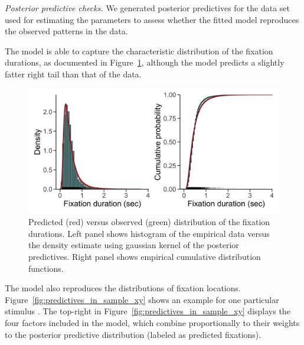 \documentclass{article}
\begin{document}
\textit{Posterior predictive checks.} We generated posterior predictives for the data set used for estimating the parameters to assess whether the fitted model reproduces the observed patterns in the data.

The model is able to capture the characteristic distribution of the fixation durations, as documented in Figure~\ref{fig:predictives_in_sample_durations}, although the model predicts a slightly fatter right tail than that of the data.

\begin{figure}
    \centering
    \includegraphics[width=\textwidth]{figures/fit_model/in_sample/fixation_durations.jpg}
    \caption{Predicted (red) versus observed (green) distribution of the fixation durations. Left panel shows histogram of the empirical data versus the density estimate using gaussian kernel of the posterior predictives. Right panel shows empirical cumulative distribution functions.}
    \label{fig:predictives_in_sample_durations}
\end{figure}

The model also reproduces the distributions of fixation locations.  Figure~\ref{fig:predictives_in_sample_xy} shows an example for one particular stimulus \citep[image number $251$ from][]{xu2014beyond}. The top-right in Figure~\ref{fig:predictives_in_sample_xy} displays the four factors included in the model, which combine proportionally to their weights to the posterior predictive distribution (labeled as predicted fixations).
\end{document}
